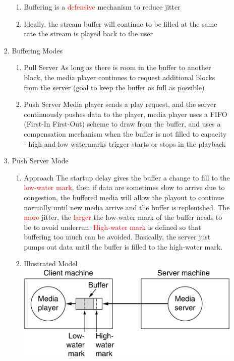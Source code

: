 \documentclass[a4paper,10pt]{article}
\newcommand{\red}[1]{\textcolor{red}{#1}}
\begin{document}
\begin{enumerate}
\begin{enumerate}
\begin{enumerate}
\begin{enumerate}
              \item Buffering is a \red{defensive} mechanism to reduce jitter
              \item Ideally, the stream buffer will continue to be filled at the same rate the stream is played back to the user
            \end{enumerate}
          \item Buffering Modes
            \begin{enumerate}
              \item Pull Server
                \newline As long as there is room in the buffer to another block, the media player continues to request additional blocks from the server (goal to keep the buffer as full as possible)
              \item Push Server
                \newline Media player sends a play request, and the server continuously pushes data to the player, media player uses a FIFO (First-In First-Out) scheme to draw from the buffer, and uses a compensation mechanism when the buffer is not filled to capacity - high and low watermarks trigger starts or stops in the playback
            \end{enumerate}
          \item Push Server Mode
            \begin{enumerate}
              \item Approach
                \newline The startup delay gives the buffer a change to fill to the \red{low-water mark}, then if data are sometimes slow to arrive due to congestion, the buffered media will allow the playout to continue normally until new media arrive and the buffer is replenished.
                \newline The \red{more} jitter, the \red{larger} the low-water mark of the buffer needs to be to avoid underrun.
                \newline \red{High-water mark} is defined so that buffering too much can be avoided. Basically, the server just pumps out data until the buffer is filled to the high-water mark.
              \item Illustrated Model
                \newline\includegraphics[width=\textwidth]{mediajitter}
            \end{enumerate}
        \end{enumerate}
    \end{enumerate}
\end{enumerate}
\end{document}
